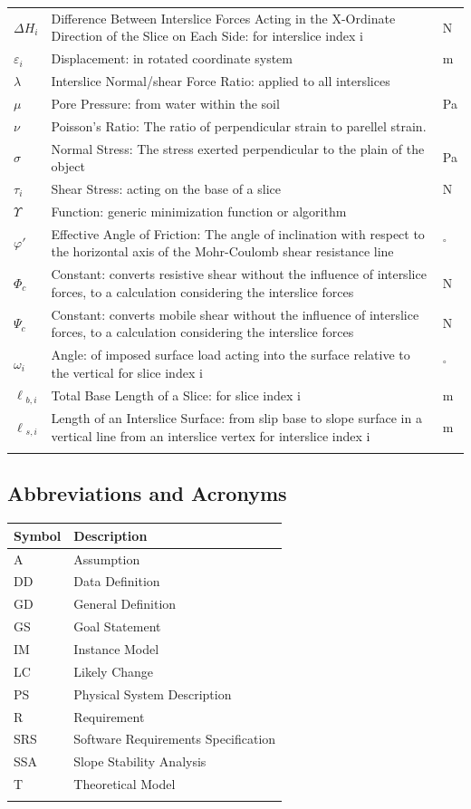 \documentclass[12pt]{article}
\begin{document}
\begin{longtable*}{l l l}
$\Delta{}H_{i}$ & Difference Between Interslice Forces Acting in the X-Ordinate Direction of the Slice on Each Side: for interslice index i & N
\\
$\varepsilon{}_{i}$ & Displacement: in rotated coordinate system & m
\\
$\lambda{}$ & Interslice Normal/shear Force Ratio: applied to all interslices & 
\\
$\mu{}$ & Pore Pressure: from water within the soil & Pa
\\
$\nu{}$ & Poisson's Ratio: The ratio of perpendicular strain to parellel strain. & 
\\
$\sigma{}$ & Normal Stress: The stress exerted perpendicular to the plain of the object & Pa
\\
$\tau{}_{i}$ & Shear Stress: acting on the base of a slice & N
\\
$\Upsilon{}$ & Function: generic minimization function or algorithm & 
\\
$\varphi{}'$ & Effective Angle of Friction: The angle of inclination with respect to the horizontal axis of the Mohr-Coulomb shear resistance line & ${}^{\circ}$
\\
$\Phi{}_{c}$ & Constant: converts resistive shear without the influence of interslice forces, to a calculation considering the interslice forces & N
\\
$\Psi{}_{c}$ & Constant: converts mobile shear without the influence of interslice forces, to a calculation considering the interslice forces & N
\\
$\omega{}_{i}$ & Angle: of imposed surface load acting into the surface relative to the vertical for slice index i & ${}^{\circ}$
\\
$\ell{}_{b,i}$ & Total Base Length of a Slice: for slice index i & m
\\
$\ell{}_{s,i}$ & Length of an Interslice Surface: from slip base to slope surface in a vertical line from an interslice vertex for interslice index i & m
\\
\bottomrule
\label{Table:TablofSymb}
\end{longtable*}
\subsection{Abbreviations and Acronyms}
\label{Sec:AbbrandAcro}
\begin{longtable*}{l l}
\toprule
Symbol & Description
\\
\midrule
A & Assumption
\\
DD & Data Definition
\\
GD & General Definition
\\
GS & Goal Statement
\\
IM & Instance Model
\\
LC & Likely Change
\\
PS & Physical System Description
\\
R & Requirement
\\
SRS & Software Requirements Specification
\\
SSA & Slope Stability Analysis
\\
T & Theoretical Model
\\
\bottomrule
\label{Table:AbbrandAcro}
\end{longtable*}
\end{document}
